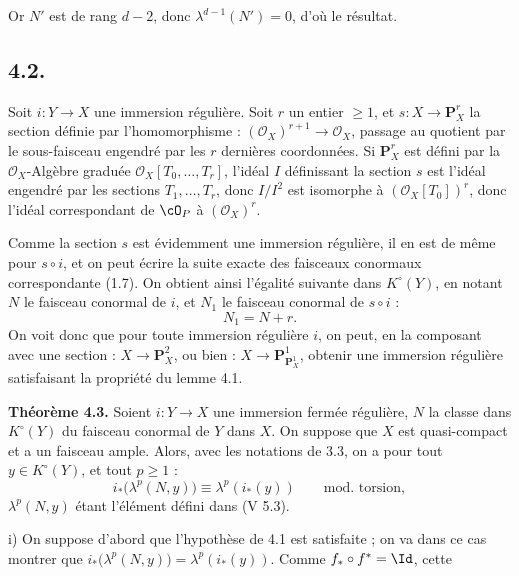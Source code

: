 Or \(N'\) est de
rang \(d-2\), donc \(\lambda^{d-1}(N')=0\), d'où le résultat.

\subsection*{4.2.}

Soit \(i:Y\to X\) une immersion régulière. Soit \(r\) un entier \(\ge1\), et \(s:X\longrightarrow \mathbf P_X^r\) la section définie par l'homomorphisme : \((\mathcal O_X)^{r+1}\to\mathcal O_X\), passage au quotient par le sous-faisceau engendré par les \(r\) dernières coordonnées. Si \(\mathbf P_X^r\) est défini par la \(\mathcal O_X\)-Algèbre graduée \(\mathcal O_X[T_0,\ldots,T_r]\), l'idéal \(I\) définissant la section \(s\) est l'idéal engendré par les sections \(T_1,\ldots,T_r\), donc \(I/I^2\) est isomorphe à \((\mathcal O_X[T_0])^r\), donc l'idéal correspondant de \(\cO_P\) à \((\mathcal O_X)^r\).

Comme la section \(s\) est évidemment une immersion régulière, il en est de même pour \(s\circ i\), et on peut écrire la suite exacte des faisceaux conormaux correspondante (1.7). On obtient ainsi l'égalité suivante dans \(K^\circ(Y)\), en notant \(N\) le faisceau conormal de \(i\), et \(N_1\) le faisceau conormal de \(s\circ i\) :
\[
  N_1=N+r.
\]
On voit donc que pour toute immersion régulière \(i\), on peut, en la composant avec une section : \(X\to\mathbf P_X^2\), ou bien : \(X\to\mathbf P_{\mathbf P_X^1}^{1}\), obtenir une immersion régulière satisfaisant la propriété du lemme 4.1.

\textbf{Théorème 4.3.} Soient \(i:Y\to X\) une immersion fermée régulière, \(N\) la classe dans \(K^\circ(Y)\) du faisceau conormal de \(Y\) dans \(X\). On suppose que \(X\) est quasi-compact et a un faisceau ample. Alors, avec les notations de 3.3, on a pour tout \(y\in K^\circ(Y)\), et tout \(p\ge1\) :
\begin{equation}\tag{4.3.1}
 i_*\bigl(\lambda^p(N,y)\bigr)\equiv \lambda^p(i_*(y))
 \qquad\text{mod. torsion},
\end{equation}
\(\lambda^p(N,y)\) étant l'élément défini dans (V 5.3).

i) On suppose d'abord que l'hypothèse de 4.1 est satisfaite ; on va dans ce cas montrer que \(i_*\bigl(\lambda^p(N,y)\bigr)=\lambda^p(i_*(y))\). Comme \(f_*\circ f^*=\Id\), cette
